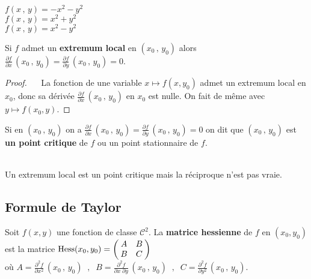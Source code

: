 \documentclass[class=report,crop=false]{standalone}
\begin{document}
{{{{{{{{{{{{{{\\
$f(x\,,\,y) = - x^2 - y^2$\\
$f(x\,,\,y) =  x^2 + y^2$\\
$f(x\,,\,y) =  x^2 - y^2$


\begin{proposition}
Si $f$ admet un {\bf extremum local} en $(x_{0}\,,\,y_{0})$ alors $\displaystyle \frac{\partial f}{\partial x} \, (x_{0}\,,\,y_{0}) = \frac{\partial f}{\partial y} \, (x_{0}\,,\,y_{0}) = 0$. 
\end{proposition}

\begin{proof} ~~ La fonction de une variable $x\mapsto f(x,y_0)$ admet un extremum local en $x_0$, donc sa dérivée $\displaystyle \frac{\partial f}{\partial x} \, (x_{0}\,,\,y_{0})$ en $x_0$ est nulle. On fait de m\^eme avec $y\mapsto f(x_0,y)$.
\end{proof}

\begin{definition}
Si en $(x_{0}\,,\,y_{0})$ on a $\displaystyle \frac{\partial f}{\partial x} \, (x_{0}\,,\,y_{0}) = \frac{\partial f}{\partial y} \, (x_{0}\,,\,y_{0}) = 0$ on dit que $(x_{0}\,,\,y_{0})$ est {\bf un point critique} de $f$ ou un point stationnaire de $f$.
\end{definition}


\\
Un extremum local est un point critique mais la réciproque n'est pas vraie.




\subsection{Formule de Taylor}

\begin{definition}
 Soit $f(x,y)$ une fonction de classe $\mathcal{C}^2$.
La {\bf matrice hessienne} de $f$ en $(x_0,y_0)$ est la matrice
$\mathrm{Hess}(x_0,y_0) = \left(\hspace{-1mm} \begin{array}{cc}
A & B \\
B & C
\end{array}\hspace{-1mm}\right)$\\
o\`u $A = \displaystyle \frac{\partial^2 f}{\partial x^2}\, (x_{0}\,,\,y_{0}) \;\;,\;\;B = \frac{\partial^2 f}{\partial x\; \partial y}\, (x_{0}\,,\,y_{0}) \;\;,\;\; C = \displaystyle \frac{\partial^2 f}{\partial y^2}\, (x_{0}\,,\,y_{0})$.
\end{definition}


}}}}}}}}}}}}}}
\end{document}

